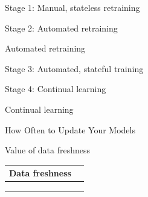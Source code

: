 \begin{frame}{Stage 1: Manual, stateless retraining}
  \begin{withmargin}
    \begin{tdmain}
    \end{tdmain}
    \begin{tdmargin}
    \end{tdmargin}
  \end{withmargin}
\end{frame}

\begin{frame}{Stage 2: Automated retraining}
  \begin{tdcodet}{Automated retraining}
  \end{tdcodet}
  \begin{takeaway}
  \end{takeaway}
\end{frame}

\begin{frame}{Stage 3: Automated, stateful training}
  \begin{withmargin}
    \begin{tdmain}
    \end{tdmain}
    \begin{tdmargin}
    \end{tdmargin}
  \end{withmargin}
\end{frame}

\begin{frame}{Stage 4: Continual learning}
  \begin{tddef}{Continual learning}
  \end{tddef}
\end{frame}

\begin{frame}{How Often to Update Your Models}
  \begin{withmargin}
    \begin{tdmain}
    \end{tdmain}
    \begin{tdmargin}
    \end{tdmargin}
  \end{withmargin}
\end{frame}

\begin{frame}{Value of data freshness}
  \footnotesize
  \renewcommand{\arraystretch}{1.35}
  \begin{tabular}{@{}%
    >{\raggedright\arraybackslash}p{}%
    >{\raggedright\arraybackslash}p{}@{}}
    \toprule
    \textbf{Data freshness} & \\
    \midrule
     & \\
     & \\
     & \\
    \bottomrule
  \end{tabular}
\end{frame}

